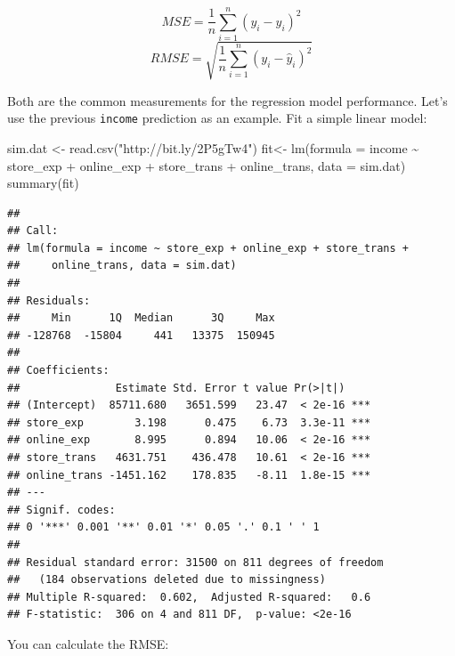 \documentclass[
  12pt,
]{krantz}
\makeatletter
\newenvironment{Shaded}{\begin{snugshade}}{\end{snugshade}}
\newcommand{\AttributeTok}[1]{\textcolor[rgb]{0.61,0.61,0.61}{#1}}
\newcommand{\DecValTok}[1]{\textcolor[rgb]{0.06,0.06,0.06}{#1}}
\newcommand{\FunctionTok}[1]{\textcolor[rgb]{0,0,0}{#1}}
\newcommand{\NormalTok}[1]{#1}
\newcommand{\OtherTok}[1]{\textcolor[rgb]{0.37,0.37,0.37}{#1}}
\newcommand{\SpecialCharTok}[1]{\textcolor[rgb]{0,0,0}{#1}}
\newcommand{\StringTok}[1]{\textcolor[rgb]{0.5,0.5,0.5}{#1}}
\newenvironment{kframe}{%
\medskip{}
\setlength{\fboxsep}{.8em}
 \def\at@end@of@kframe{}%
 \ifinner\ifhmode%
  \def\at@end@of@kframe{\end{minipage}}%
  \begin{minipage}{\columnwidth}%
 \fi\fi%
 \def\FrameCommand##1{\hskip\@totalleftmargin \hskip-\fboxsep
 \colorbox{shadecolor}{##1}\hskip-\fboxsep
     \hskip-\linewidth \hskip-\@totalleftmargin \hskip\columnwidth}%
 \MakeFramed {\advance\hsize-\width
   \@totalleftmargin\z@ \linewidth\hsize
   \@setminipage}}%
 {\par\unskip\endMakeFramed%
 \at@end@of@kframe}
\renewenvironment{Shaded}{\begin{kframe}}{\end{kframe}}
\makeatother
\begin{document}
\[MSE=\frac{1}{n}\sum_{i=1}^{n}(y_{i}-\hat{y}_{i})^{2}\]
\[RMSE=\sqrt{\frac{1}{n}\sum_{i=1}^{n}(y_{i}-\hat{y}_{i})^{2}}\]

Both are the common measurements for the regression model performance. Let's use the previous \texttt{income} prediction as an example. Fit a simple linear model:

\begin{Shaded}
\begin{Highlighting}[]
\NormalTok{sim.dat }\OtherTok{\textless{}{-}} \FunctionTok{read.csv}\NormalTok{(}\StringTok{"http://bit.ly/2P5gTw4"}\NormalTok{)}
\NormalTok{fit}\OtherTok{\textless{}{-}} \FunctionTok{lm}\NormalTok{(}\AttributeTok{formula =}\NormalTok{ income }\SpecialCharTok{\textasciitilde{}}\NormalTok{ store\_exp }\SpecialCharTok{+}\NormalTok{ online\_exp }\SpecialCharTok{+}\NormalTok{ store\_trans }\SpecialCharTok{+} 
\NormalTok{    online\_trans, }\AttributeTok{data =}\NormalTok{ sim.dat)}
\FunctionTok{summary}\NormalTok{(fit)}
\end{Highlighting}
\end{Shaded}

\begin{verbatim}
## 
## Call:
## lm(formula = income ~ store_exp + online_exp + store_trans + 
##     online_trans, data = sim.dat)
## 
## Residuals:
##     Min      1Q  Median      3Q     Max 
## -128768  -15804     441   13375  150945 
## 
## Coefficients:
##               Estimate Std. Error t value Pr(>|t|)    
## (Intercept)  85711.680   3651.599   23.47  < 2e-16 ***
## store_exp        3.198      0.475    6.73  3.3e-11 ***
## online_exp       8.995      0.894   10.06  < 2e-16 ***
## store_trans   4631.751    436.478   10.61  < 2e-16 ***
## online_trans -1451.162    178.835   -8.11  1.8e-15 ***
## ---
## Signif. codes:  
## 0 '***' 0.001 '**' 0.01 '*' 0.05 '.' 0.1 ' ' 1
## 
## Residual standard error: 31500 on 811 degrees of freedom
##   (184 observations deleted due to missingness)
## Multiple R-squared:  0.602,  Adjusted R-squared:   0.6 
## F-statistic:  306 on 4 and 811 DF,  p-value: <2e-16
\end{verbatim}

You can calculate the RMSE:

\begin{Shaded}
\end{Shaded}
\end{document}
